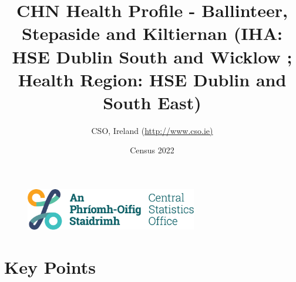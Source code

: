 \documentclass{article}
\title{CHN Health Profile - Ballinteer, Stepaside and Kiltiernan (IHA: HSE Dublin South and Wicklow ;  Health Region: HSE Dublin and South East) }
\date{Census 2022}
\author{CSO, Ireland  (\url{http://www.cso.ie)}}
\begin{document}


\begin{figure}
	\centering
\includegraphics[width =75mm]{../figures/CSO_Logo.png}
\end{figure}

				 
		   
						  
														  
																																													
												 
			 
\maketitle
					
													   
				 
						 
																																																																											   
				 
				  
  \pagebreak
    	    \tableofcontents

\pagebreak


\section{Key Points}
\end{document}
